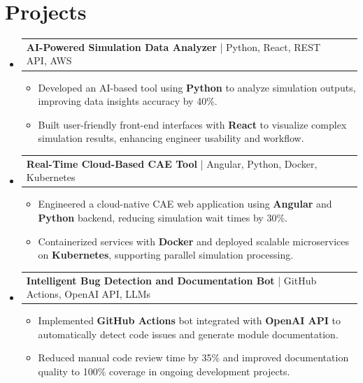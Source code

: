 \documentclass[letterpaper,11pt]{article}
\makeatletter
\newcommand{\resumeItem}[1]{
  \item\footnotesize{
    {#1 \vspace{-2pt}}
  }
}
\newcommand{\resumeProjectHeading}[2]{
    \item
    \begin{tabular*}{1.001\textwidth}{l@{\extracolsep{\fill}}r}
      \small#1 & \textbf{\small #2}\\
    \end{tabular*}\vspace{-7pt}
}
\newcommand{\resumeSubHeadingListStart}{\begin{itemize}[leftmargin=0pt, label={}]}
\newcommand{\resumeSubHeadingListEnd}{\end{itemize}}
\newcommand{\resumeItemListStart}{\begin{itemize}[leftmargin=*]}
\newcommand{\resumeItemListEnd}{\end{itemize}\vspace{-5pt}}
\makeatother
\begin{document}
\section{Projects}
    \vspace{-5pt}
    \resumeSubHeadingListStart
      \resumeProjectHeading
          {\textbf{AI-Powered Simulation Data Analyzer} | Python, React, REST API, AWS}{}
          \resumeItemListStart
              \resumeItem{Developed an AI-based tool using \textbf{Python} to analyze simulation outputs, improving data insights accuracy by 40\%.}
              \resumeItem{Built user-friendly front-end interfaces with \textbf{React} to visualize complex simulation results, enhancing engineer usability and workflow.}
          \resumeItemListEnd
          \vspace{-12pt}
      \resumeProjectHeading
          {\textbf{Real-Time Cloud-Based CAE Tool} | Angular, Python, Docker, Kubernetes}{}
          \resumeItemListStart
              \resumeItem{Engineered a cloud-native CAE web application using \textbf{Angular} and \textbf{Python} backend, reducing simulation wait times by 30\%.}
              \resumeItem{Containerized services with \textbf{Docker} and deployed scalable microservices on \textbf{Kubernetes}, supporting parallel simulation processing.}
          \resumeItemListEnd
          \vspace{-12pt}
      \resumeProjectHeading
          {\textbf{Intelligent Bug Detection and Documentation Bot} | GitHub Actions, OpenAI API, LLMs}{}
          \resumeItemListStart
              \resumeItem{Implemented \textbf{GitHub Actions} bot integrated with \textbf{OpenAI API} to automatically detect code issues and generate module documentation.}
              \resumeItem{Reduced manual code review time by 35\% and improved documentation quality to 100\% coverage in ongoing development projects.}
          \resumeItemListEnd 
    \resumeSubHeadingListEnd
\end{document}

